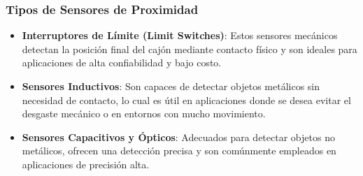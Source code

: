\subsubsection{Tipos de Sensores de Proximidad}
\begin{itemize}
    \item \textbf{Interruptores de Límite (Limit Switches)}: Estos sensores mecánicos detectan la posición final del cajón mediante contacto físico y son ideales para aplicaciones de alta confiabilidad y bajo costo.
    \item \textbf{Sensores Inductivos}: Son capaces de detectar objetos metálicos sin necesidad de contacto, lo cual es útil en aplicaciones donde se desea evitar el desgaste mecánico o en entornos con mucho movimiento.
    \item \textbf{Sensores Capacitivos y Ópticos}: Adecuados para detectar objetos no metálicos, ofrecen una detección precisa y son comúnmente empleados en aplicaciones de precisión alta.
\end{itemize}

